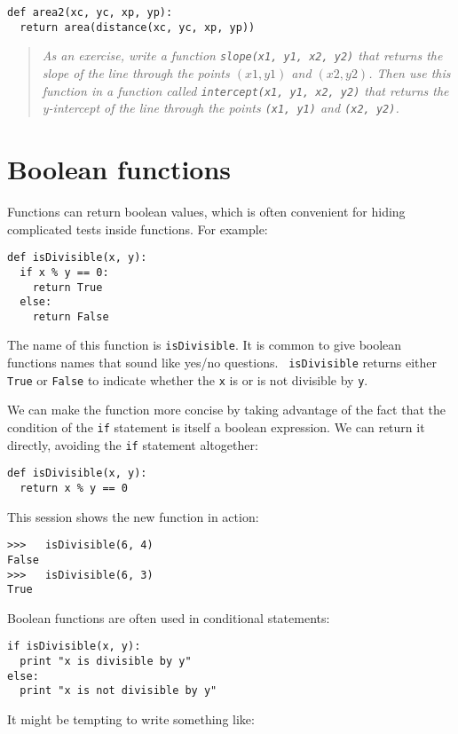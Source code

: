 \beforeverb
\begin{verbatim}
def area2(xc, yc, xp, yp):
  return area(distance(xc, yc, xp, yp))
\end{verbatim}
\afterverb
%
\begin{quote}
{\em As an exercise, write a function {\tt slope(x1, y1, x2, y2)}
that returns the slope of the line through the points $(x1, y1)$ and
$(x2, y2)$.  Then use this function in a function called
{\tt intercept(x1, y1, x2, y2)} that returns the y-intercept of the
line through the points {\tt (x1, y1)} and {\tt (x2, y2)}.}
\end{quote}


\section{Boolean functions}
\label{boolean}

Functions can return boolean values, which is often convenient for hiding
complicated tests inside functions.  For example:

\beforeverb
\begin{verbatim}
def isDivisible(x, y):
  if x % y == 0:
    return True
  else:
    return False
\end{verbatim}
\afterverb
%
The name of this function is {\tt isDivisible}.  It is common to give
boolean functions names that sound like yes/no questions.  {\tt
isDivisible} returns either {\tt True} or {\tt False} to indicate whether the
{\tt x} is or is not divisible by {\tt y}.

We can make the function more concise by taking advantage of the fact
that the condition of the {\tt if} statement is itself a boolean
expression.  We can return it directly, avoiding the {\tt if}
statement altogether:

\beforeverb
\begin{verbatim}
def isDivisible(x, y):
  return x % y == 0
\end{verbatim}
\afterverb
%
This session shows the new function in action:

\beforeverb
\begin{verbatim}
>>>   isDivisible(6, 4)
False
>>>   isDivisible(6, 3)
True
\end{verbatim}
\afterverb
%
Boolean functions are often used in conditional statements:

\beforeverb
\begin{verbatim}
if isDivisible(x, y):
  print "x is divisible by y"
else:
  print "x is not divisible by y"
\end{verbatim}
\afterverb
%
It might be tempting to write something like:

